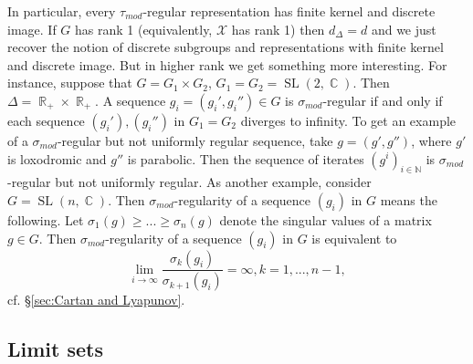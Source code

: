 \documentclass[12pt]{amsbook}%
\theoremstyle{definition}
\theoremstyle{remark}
\numberwithin{section}{chapter}
\numberwithin{subsection}{section}
\numberwithin{figure}{chapter}
\DeclareMathOperator{\C}{\mathbb{C}}
\DeclareMathOperator{\SL}{SL}
\DeclareMathOperator{\R}{\mathbb{R}}
\def\taumod{\tau_{mod}}
\def\simod{\sigma_{mod}}
\def\bN{{\mathbb{N}}}
\def\cX{{\mathscr{X}}}
\begin{document}
{{In particular, every $\taumod$-regular representation has finite kernel and discrete image. If $G$ has rank 1 (equivalently, $\cX$ has rank 1) then 
$d_\Delta =d$ and we just recover the notion of discrete subgroups and representations with finite kernel and discrete image. But in higher rank we get something more interesting. For instance, suppose that $G=G_1\times G_2$, $G_1=G_2=\SL(2,\C)$. Then $\Delta=\R_+\times \R_+$. 
A sequence $g_i=(g_i', g_i'')\in G$ is $\simod$-regular if and only if each sequence $(g_i'), (g_i'')$ in $G_1=G_2$ diverges to infinity. To get an example of a $\simod$-regular but not uniformly regular sequence, take $g=(g', g'')$, where $g'$ is loxodromic and $g''$ is parabolic. Then the sequence of iterates $(g^i)_{i\in \bN}$ is $\simod$-regular but not uniformly regular. As another example, consider $G=\SL(n,\C)$. Then $\simod$-regularity of a sequence $(g_i)$ in $G$ means the following. Let $\sigma_1(g)\ge ...\ge \sigma_n(g)$ denote the singular values of a matrix $g\in G$. Then $\simod$-regularity of a sequence $(g_i)$ in $G$ is equivalent to 
$$
\lim_{i\to\infty} \frac{\sigma_k(g_i)}{\sigma_{k+1}(g_i)}=\infty,  k=1,...,n-1, 
$$
cf.  \S \ref{sec:Cartan and Lyapunov}. 

\subsection{Limit sets}
\label{sec:flag_limit_set}

}}
\end{document}
